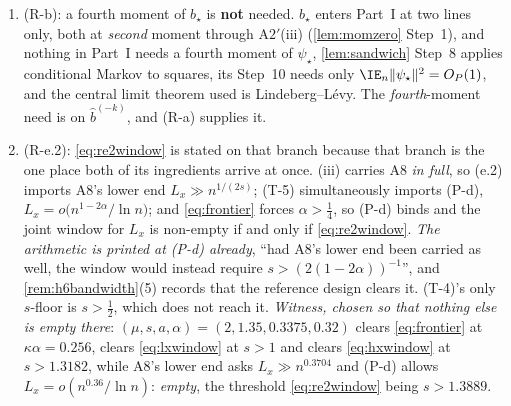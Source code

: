\begin{remark}
\begin{enumerate}
every sample point, is what (R-a) adds to it, at the results that do.
\item[(4)] \textup{(R-b)}: a fourth moment of $b_\star$ is \textbf{not} needed. $b_\star$ enters
Part~I at two lines only, both at \emph{second} moment through A$2'$(iii) (\cref{lem:momzero} Step~1), and
nothing in Part~I needs a fourth moment of $\psi_\star$, \cref{lem:sandwich} Step~8 applies conditional
Markov to squares, its Step~10 needs only $\IE_n\|\psi_\star\|^{2}=O_P(1)$, and the central limit theorem
used is Lindeberg--L\'evy. The \emph{fourth}-moment need is on $\hat b^{(-k)}$, and (R-a) supplies it.
\item[(5)] \textup{(R-e.2)}: \eqref{eq:re2window} is stated on that branch because that branch is
the one place both of its ingredients arrive at once. \textup{(iii)} carries A8
\emph{in full}, so (e.2) imports A8's lower end $L_x\gg n^{1/(2s)}$; (T-5) simultaneously imports (P-d),
$L_x=o\big(n^{1-2\alpha}/\ln n\big)$; and \eqref{eq:frontier} forces $\alpha>\tfrac14$, so (P-d) binds and
the joint window for $L_x$ is non-empty if and only if \eqref{eq:re2window}. \emph{The arithmetic is
printed at (P-d) already}, ``had A8's lower end been carried as well, the window would instead require
$s>(2(1-2\alpha))^{-1}$'', and \cref{rem:h6bandwidth}\textup{(5)} records that the reference design
clears it. (T-4)'s only $s$-floor is $s>\tfrac12$, which does not reach it.
\emph{Witness, chosen so that nothing else is empty there}: $(\mu,s,a,\alpha)=(2,1.35,0.3375,0.32)$ clears
\eqref{eq:frontier} at $\kappa\alpha=0.256$, clears \eqref{eq:lxwindow} at $s>1$ and clears
\eqref{eq:hxwindow} at $s>1.3182$, while A8's lower end asks $L_x\gg n^{0.3704}$ and (P-d) allows
$L_x=o(n^{0.36}/\ln n)$: \emph{empty}, the threshold \eqref{eq:re2window} being $s>1.3889$.

\end{enumerate}
\end{remark}
